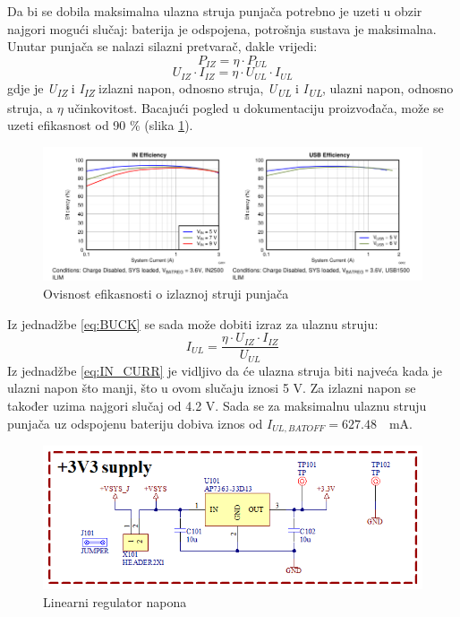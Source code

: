Da bi se dobila maksimalna ulazna struja punjača potrebno je uzeti u obzir najgori mogući slučaj: baterija je odspojena, potrošnja sustava je maksimalna. Unutar punjača se nalazi silazni pretvarač, dakle vrijedi:
\begin{equation}
    P_{IZ}=\eta \cdot P_{UL}
\end{equation}
\begin{equation} \label{eq:BUCK}
    U_{IZ}\cdot I_{IZ}=\eta \cdot U_{UL} \cdot I_{UL}
\end{equation}
gdje je \textit{U\textsubscript{IZ}} i \textit{I\textsubscript{IZ}} izlazni napon, odnosno struja, \textit{U\textsubscript{UL}} i \textit{I\textsubscript{UL}}, ulazni napon, odnosno struja, a $\eta$ učinkovitost. Bacajući pogled u dokumentaciju proizvođača, može se uzeti efikasnost od 90 \% (slika \ref{slk:EFFICIENCY}).
\begin{figure}[hbt]
    \centering
    \includegraphics[width=\textwidth]{Figures/EFFICIENCY.PNG}
    \caption{Ovisnost efikasnosti o izlaznoj struji punjača \cite{ti:bq24166}}
    \label{slk:EFFICIENCY}
\end{figure}
Iz jednadžbe \ref{eq:BUCK} se sada može dobiti izraz za ulaznu struju:
\begin{equation} \label{eq:IN_CURR}
    I_{UL}=\frac{\eta \cdot U_{IZ} \cdot I_{IZ}}{U_{UL}}
\end{equation}
Iz jednadžbe \ref{eq:IN_CURR} je vidljivo da će ulazna struja biti najveća kada je ulazni napon što manji, što u ovom slučaju iznosi 5 V. Za izlazni napon se također uzima najgori slučaj od 4.2 V. Sada se za maksimalnu ulaznu struju punjača uz odspojenu bateriju dobiva iznos od ${I_{UL,BATOFF} = 627.48\quad \textrm{mA}}$.
\begin{figure}[hbt]
    \centering
    \includegraphics[width = 10 cm]{Figures/MB_LDO.png}
    \caption{Linearni regulator napona}
    \label{slk:MB_LDO}
\end{figure}

